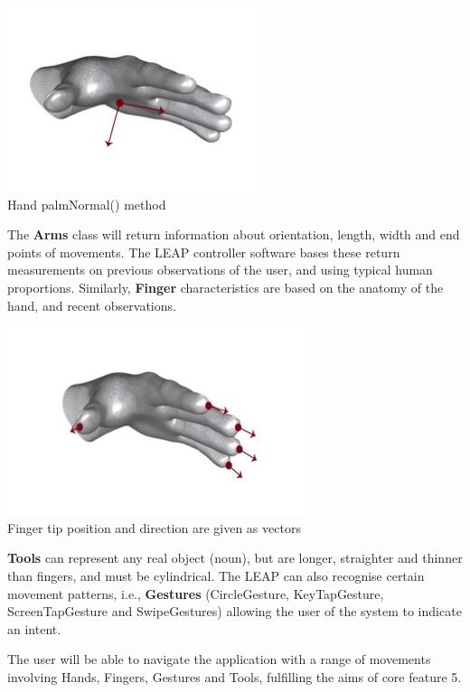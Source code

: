 \documentclass[a4paper, 10pt]{article}
\begin{document}
\begin{center}
\includegraphics[scale=0.4]{palm}\\
Hand palmNormal() method \cite{leap}
\end{center}

The \textbf{Arms} class will return information about orientation, length, width and end points of movements. The LEAP controller software bases these return measurements on previous observations of the user, and using typical human proportions. Similarly, \textbf{Finger} characteristics are based on the anatomy of the hand, and recent observations. 

\begin{center}
\includegraphics[scale=0.4]{fingers}\\
Finger tip position and direction are given as vectors \cite{leap}
\end{center}

\textbf{Tools} can represent any real object (noun), but are longer, straighter and thinner than fingers, and must be cylindrical. The LEAP can also recognise certain movement patterns, i.e., \textbf{Gestures} (CircleGesture, KeyTapGesture, ScreenTapGesture and SwipeGestures) allowing the user of the system to indicate an intent.

The user will be able to navigate the application with a range of movements involving Hands, Fingers, Gestures and Tools, fulfilling the aims of core feature 5.
\end{document}
